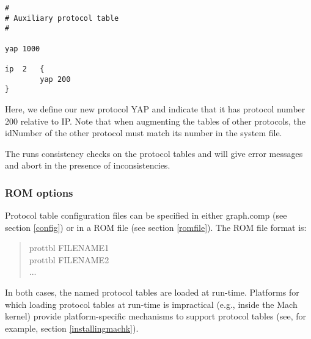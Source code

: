 \begin{verbatim}
#
# Auxiliary protocol table 
#

yap	1000

ip	2 	{
        yap	200
}
\end{verbatim}

Here, we define our new protocol YAP and indicate that it has protocol
number 200 relative to IP.  Note that when augmenting the tables of
other protocols, the idNumber of the other protocol must match its
number in the system file.

The \xk{} runs consistency checks on the protocol tables and will give
error messages and abort in the presence of inconsistencies.



\subsubsection{ROM options}
\label{protTblRomOpt}

Protocol table configuration files can be specified in either
graph.comp (see section
\ref{config}) or in a ROM file (see section \ref{romfile}).  The ROM
file format is:

\begin{quote}
\begin{tt}
prottbl FILENAME1\\
prottbl FILENAME2\\
...
\end{tt}
\end{quote}

\noindent
In both cases, the named protocol tables are loaded at run-time.
Platforms for which loading protocol tables at run-time is impractical
(e.g., inside the Mach kernel) provide platform-specific mechanisms
to support protocol tables (see, for example, section
\ref{installingmachk}). 

